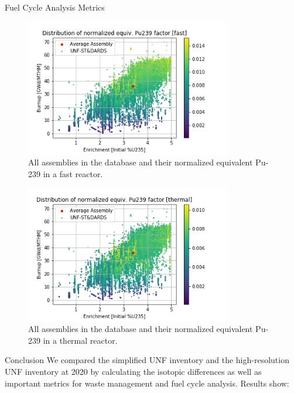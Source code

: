 \documentclass[final]{beamer}
\newlength{\onecolwid}
\newlength{\threecolwid}
\begin{document}
\begin{frame}[t]
\begin{columns}[t,totalwidth=\threecolwid]
\begin{column}{\onecolwid}
\begin{block}{Fuel Cycle Analysis Metrics}
\begin{figure}
    \centering
    \includegraphics[width=0.8\textwidth]{../images/fast_all.png}
    \caption{All assemblies in the database and their normalized equivalent Pu-239 in a fast reactor.}
    \label{fig:fast_all}
\end{figure}

\begin{figure}
    \centering
    \includegraphics[width=0.8\textwidth]{../images/thermal_all.png}
    \caption{All assemblies in the database and their normalized equivalent Pu-239 in a thermal reactor.}
    \label{fig:thermal_all}
\end{figure}
\end{block}

\begin{alertblock}{Conclusion}
We compared the simplified \gls{UNF}
inventory and the high-resolution \gls{UNF} inventory
at 2020 by calculating the isotopic differences as well
as important metrics for waste management and fuel cycle analysis. Results show:
\bigskip \bigskip


\end{alertblock}
\end{column}
\end{columns}
\end{frame}
\end{document}
